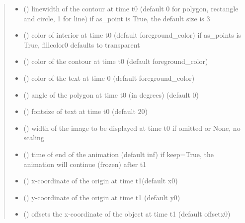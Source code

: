 \documentclass[letterpaper,10pt,english]{sphinxmanual}
\begin{document}
\begin{fulllineitems}
\begin{quote}
\begin{description}
\begin{itemize}
\item {} 
 () \textendash{} linewidth of the contour at time t0 (default 0 for polygon, rectangle and circle, 1 for line) 
if as\_point is True, the default size is 3

\item {} 
 () \textendash{} color of interior at time t0 (default foreground\_color) 
if as\_points is True, fillcolor0 defaults to transparent

\item {} 
 () \textendash{} color of the contour at time t0 (default foreground\_color)

\item {} 
 () \textendash{} color of the text at time 0 (default foreground\_color)

\item {} 
 () \textendash{} angle of the polygon at time t0 (in degrees) (default 0)

\item {} 
 () \textendash{} fontsize of text at time t0 (default 20)

\item {} 
 () \textendash{} width of the image to be displayed at time t0 
if omitted or None, no scaling

\item {} 
 () \textendash{} time of end of the animation (default inf) 
if keep=True, the animation will continue (frozen) after t1

\item {} 
 () \textendash{} x-coordinate of the origin at time t1(default x0)

\item {} 
 () \textendash{} y-coordinate of the origin at time t1 (default y0)

\item {} 
 () \textendash{} offsets the x-coordinate of the object at time t1 (default offsetx0)


\end{itemize}
\end{description}
\end{quote}
\end{fulllineitems}
\end{document}
